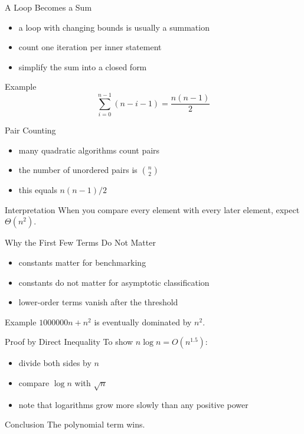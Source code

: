 \documentclass[aspectratio=169,xcolor=dvipsnames]{beamer}
\begin{document}
\begin{frame}{A Loop Becomes a Sum}
  \begin{itemize}
    \item a loop with changing bounds is usually a summation
    \item count one iteration per inner statement
    \item simplify the sum into a closed form
  \end{itemize}
  \begin{exampleblock}{Example}
    \[
      \sum_{i=0}^{n-1} (n-i-1) = \frac{n(n-1)}{2}
    \]
  \end{exampleblock}
\end{frame}

\begin{frame}{Pair Counting}
  \begin{itemize}
    \item many quadratic algorithms count pairs
    \item the number of unordered pairs is $\binom{n}{2}$
    \item this equals $n(n-1)/2$
  \end{itemize}
  \begin{block}{Interpretation}
    When you compare every element with every later element, expect $\Theta(n^2)$.
  \end{block}
\end{frame}

\begin{frame}{Why the First Few Terms Do Not Matter}
  \begin{itemize}
    \item constants matter for benchmarking
    \item constants do not matter for asymptotic classification
    \item lower-order terms vanish after the threshold
  \end{itemize}
  \begin{exampleblock}{Example}
    $1000000n + n^2$ is eventually dominated by $n^2$.
  \end{exampleblock}
\end{frame}

\begin{frame}{Proof by Direct Inequality}
  To show $n \log n = O(n^{1.5})$:
  \begin{itemize}
    \item divide both sides by $n$
    \item compare $\log n$ with $\sqrt{n}$
    \item note that logarithms grow more slowly than any positive power
  \end{itemize}
  \begin{block}{Conclusion}
    The polynomial term wins.
  \end{block}
\end{frame}
\end{document}
